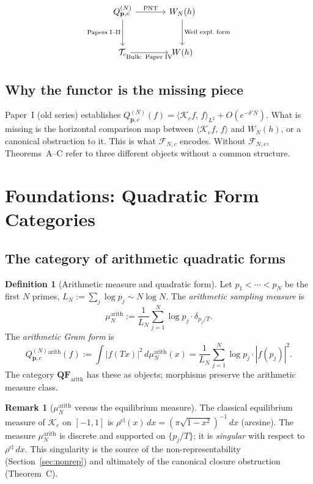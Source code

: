 \documentclass[12pt,a4paper]{amsart}
\theoremstyle{definition}
\newtheorem{definition}[theorem]{Definition}
\newtheorem{remark}[theorem]{Remark}
\newcommand{\Kop}{\mathcal{K}_c}
\newcommand{\QM}{Q^{(N)}_{\mathbf{p},c}}
\newcommand{\ip}[2]{\langle #1,\, #2\rangle}
\newcommand{\Fcal}{\mathcal{F}_{N,c}}
\newcommand{\Tcal}{\mathcal{T}_c}
\newcommand{\WeilN}{W_N}
\newcommand{\muarith}{\mu^{\mathrm{arith}}_N}
\newcommand{\rhocl}{\rho^{\mathrm{cl}}}
\begin{document}
\begin{equation}\label{eq:diagram_informal}
\begin{tikzcd}[column sep=3.5em, row sep=3em]
  \QM
    \arrow[r, "\mathrm{PNT}"]
    \arrow[d, "\text{Papers I--II}"']
  & \WeilN(h)
    \arrow[d, "\text{Weil expl.~form}"]
  \\
  \Tcal
    \arrow[r, "\text{Bulk: Paper~IV}"']
  & W(h)
\end{tikzcd}
\end{equation}

\subsection{Why the functor is the missing piece}

Paper~I (old series) \cite{OldPaperI} establishes
$\QM(f) = \ip{\Kop f}{f}_{L^2} + O(e^{-\delta' N})$.
What is missing is the horizontal comparison map between
$\ip{\Kop f}{f}$ and $W_N(h)$, or a canonical obstruction to it.
This is what $\Fcal$ encodes. Without $\Fcal$, Theorems~A--C
refer to three different objects without a common structure.

\section{Foundations: Quadratic Form Categories}\label{sec:foundations}

\subsection{The category of arithmetic quadratic forms}

\begin{definition}[Arithmetic measure and quadratic form]%
\label{def:arith_qf}
Let $p_1 < \cdots < p_N$ be the first $N$ primes,
$L_N := \sum_j \log p_j \sim N\log N$. The
\emph{arithmetic sampling measure} is
\[
  \muarith := \frac{1}{L_N}\sum_{j=1}^N \log p_j\cdot\delta_{p_j/T}.
\]
The \emph{arithmetic Gram form} is
\[
  \QM^{\mathrm{arith}}(f)
  := \int |f(Tx)|^2\,d\muarith(x)
  = \frac{1}{L_N}\sum_{j=1}^N \log p_j\cdot|f(p_j)|^2.
\]
The category $\mathbf{QF}_{\mathrm{arith}}$ has these as objects;
morphisms preserve the arithmetic measure class.
\end{definition}

\begin{remark}[$\muarith$ versus the equilibrium measure]
The classical equilibrium measure of $\Kop$ on $[-1,1]$ is
$\rhocl(x)\,dx = (\pi\sqrt{1-x^2})^{-1}\,dx$ (arcsine).
The measure $\muarith$ is discrete and supported on $\{p_j/T\}$;
it is \emph{singular} with respect to $\rhocl\,dx$.
This singularity is the source of the non-representability
(Section~\ref{sec:nonrep}) and ultimately of the canonical
closure obstruction (Theorem~C).
\end{remark}
\end{document}
